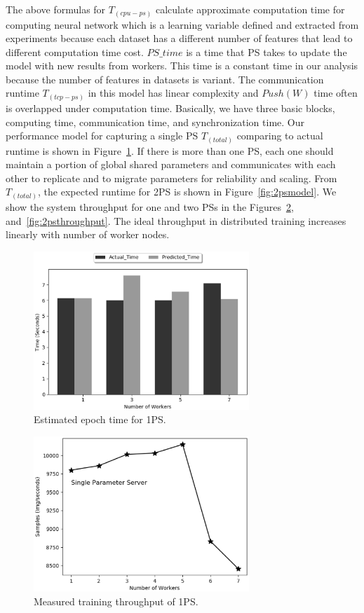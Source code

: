 \documentclass[conference]{IEEEtran}
\begin{document}
The above formulas for $T_{(cpu-ps)}$ calculate approximate computation time for computing neural network which is a learning variable defined and extracted from experiments because each dataset has a different number of features that lead to different computation time cost. $PS\_time$ is a time that PS takes to update the model with new results from workers. This time is a constant time in our analysis because the number of features in datasets is variant. The communication runtime $T_{(tcp-ps)} $ in this model has linear complexity and $Push(W)$ time often is overlapped under computation time. Basically, we have three basic blocks, computing time, communication time, and synchronization time. Our performance model for capturing a single PS $T_{(total)}$ comparing to actual runtime is shown in Figure~\ref{fig:psmodel}. If there is more than one PS, each one should maintain a portion of global shared parameters and communicates with each other to replicate and to migrate parameters for reliability and scaling. From $T_{(total)}$, the expected runtime for 2PS is shown in Figure~\ref{fig:2psmodel}. We show the system throughput for one and two PSs in the Figures~\ref{fig:psthroughput}, and~\ref{fig:2psthroughput}. The ideal throughput in distributed training increases linearly with number of worker nodes. 


\begin{figure}[htb]
  \includegraphics[width=3.2in]{Fig/psmodel}
  \caption{Estimated epoch time for 1PS.}
  \label{fig:psmodel}
\end{figure}

\begin{figure}[htb]
  \includegraphics[width=3.2in]{Fig/psthroughput}
  \caption{Measured training throughput of 1PS.}
  \label{fig:psthroughput}
\end{figure}
\end{document}
